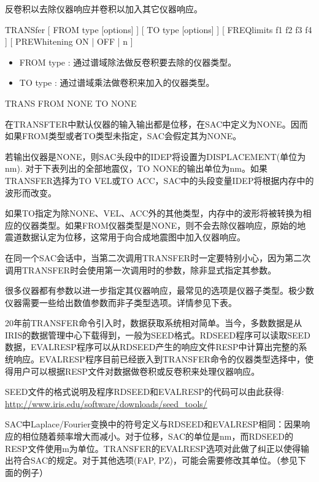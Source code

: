 \label{cmd:transfer}

反卷积以去除仪器响应并卷积以加入其它仪器响应。

TRANSfer [ FROM type [options] ] [ TO type [options] ] [ FREQlimits f1 f2 f3 f4 ] [ PREWhitening ON | OFF | n ]

\begin{itemize}
\item FROM type : 通过谱域除法做反卷积要去除的仪器类型。 
\item TO type : 通过谱域乘法做卷积来加入的仪器类型。 
\end{itemize}

TRANS FROM NONE TO NONE

在TRANSFTER中默认仪器的输入输出都是位移，在SAC中定义为NONE。因而如果FROM类型或者TO类型未指定，SAC会假定其为NONE。

若输出仪器是NONE，则SAC头段中的IDEP将设置为DISPLACEMENT(单位为nm). 对于下表列出的全部地震仪，TO NONE的输出单位为nm。如果TRANSFER选择为TO VEL或TO ACC，SAC中的头段变量IDEP将根据内存中的波形而改变。

如果TO指定为除NONE、VEL、ACC外的其他类型，内存中的波形将被转换为相应的仪器类型。如果FROM仪器类型是NONE，则不会去除仪器响应，原始的地震道数据认定为位移，这常用于向合成地震图中加入仪器响应。

在同一个SAC会话中，当第二次调用TRANSFER时一定要特别小心，因为第二次调用TRANSFER时会使用第一次调用时的参数，除非显式指定其参数。

很多仪器都有参数以进一步指定其仪器响应，最常见的选项是仪器子类型。极少数仪器需要一些给出数值参数而非子类型选项。详情参见下表。

20年前TRANSFER命令引入时，数据获取系统相对简单。当今，多数数据是从IRIS的数据管理中心下载得到，一般为SEED格式。RDSEED程序可以读取SEED数据，EVALRESP程序可以从RDSEED产生的响应文件RESP中计算出完整的系统响应。EVALRESP程序目前已经嵌入到TRANSFER命令的仪器类型选择中，使得用户可以根据RESP文件对数据做卷积或反卷积来处理仪器响应。

SEED文件的格式说明及程序RDSEED和EVALRESP的代码可以由此获得:\\
\href{http://www.iris.edu/software/downloads/seed_tools/}{http://www.iris.edu/software/downloads/seed\_tools/}

SAC中Laplace/Fourier变换中的符号定义与RDSEED和EVALRESP相同：因果响应的相位随着频率增大而减小。对于位移，SAC的单位是nm，而RDSEED的RESP文件使用m为单位。TRANSFER的EVALRESP选项对此做了纠正以使得输出符合SAC的规定。对于其他选项(FAP, PZ)，可能会需要修改其单位。（参见下面的例子）

